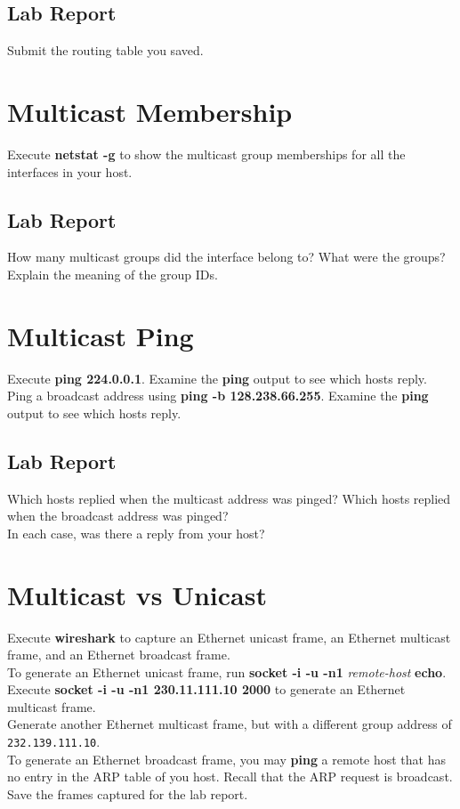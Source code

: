 \documentclass[10pt,a4paper]{article}
\numberwithin{equation}{section}
\numberwithin{figure}{section}
\numberwithin{table}{section}
\begin{document}
    \subsection*{Lab Report}
    Submit the routing table you saved.

    \section{Multicast Membership}
    Execute \textbf{netstat -g} to show the multicast group memberships for all the interfaces in your host.
    \subsection*{Lab Report}
    How many multicast groups did the interface belong to? What were the groups? Explain the meaning of the group IDs.

    \section{Multicast Ping}
    Execute \textbf{ping 224.0.0.1}.
    Examine the \textbf{ping} output to see which hosts reply. \\
    Ping a broadcast address using \textbf{ping -b 128.238.66.255}.
    Examine the \textbf{ping} output to see which hosts reply. \\
    \subsection*{Lab Report}
    Which hosts replied when the multicast address was pinged?
    Which hosts replied when the broadcast address was pinged? \\
    In each case, was there a reply from your host?

    \section{Multicast vs Unicast}
    Execute \textbf{wireshark} to capture an Ethernet unicast frame, an Ethernet multicast frame, and an Ethernet broadcast frame. \\
    To generate an Ethernet unicast frame, run \textbf{socket -i -u -n1} \textit{remote-host} \textbf{echo}. \\
    Execute \textbf{socket -i -u -n1 230.11.111.10 2000} to generate an Ethernet multicast frame. \\
    Generate another Ethernet multicast frame, but with a different group address of \texttt{232.139.111.10}. \\
    To generate an Ethernet broadcast frame, you may \textbf{ping} a remote host that has no entry in the ARP table of you host.
    Recall that the ARP request is broadcast. \\
    Save the frames captured for the lab report.
\end{document}
